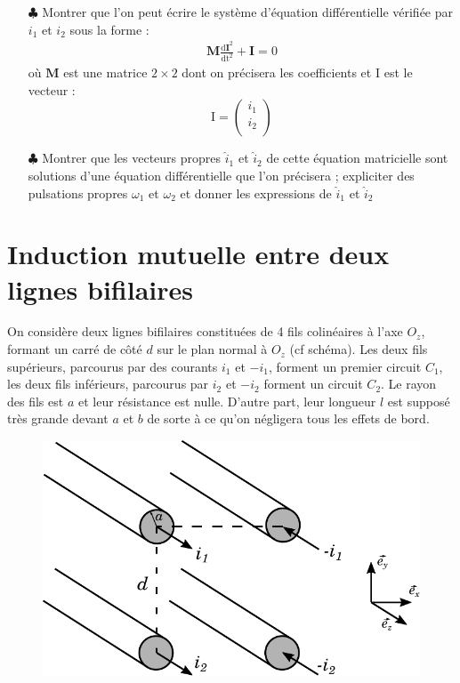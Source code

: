 \documentclass{report}
\begin{document}
\begin{itemize}

	\item[$\clubsuit$] Montrer que l'on peut écrire le système d'équation différentielle vérifiée par $i_1$ et $i_2$ sous la forme : 
	\begin{align*}
		\mathrm{\textbf{M}}\frac{\mathrm{d\textbf{I}}^2}{\mathrm{dt}^2}+\mathrm{\textbf{I}}=0
	\end{align*}
	où $\mathrm{\textbf{M}}$ est une matrice $2\times2$ dont on précisera les coefficients et $\mathrm{I}$ est le vecteur :
		\begin{equation}
	\mathrm{I}=
	\left(
	\begin{array}{ccc}
	i_1\\
	i_2\\
	\end{array}\right)
	\end{equation}		

	\item[$\clubsuit$] Montrer que les vecteurs propres $\hat{i}_1$ et $\hat{i}_2$ de cette équation matricielle sont solutions d'une équation différentielle que l'on précisera ; expliciter des pulsations propres $\omega_1$ et $\omega_2$ et donner les expressions de $\hat{i}_1$ et $\hat{i}_2$

\end{itemize}

\newpage

\section*{Induction mutuelle entre deux lignes bifilaires}

On considère deux lignes bifilaires constituées de 4 fils colinéaires à l'axe $O_z$, formant un carré de côté $d$ sur le plan normal à $O_z$ (cf schéma). Les deux fils supérieurs, parcourus par des courants $i_1$ et $-i_1$, forment un premier circuit $C_1$, les deux fils inférieurs, parcourus par $i_2$ et $-i_2$ forment un circuit $C_2$. Le rayon des fils est $a$ et leur résistance est nulle. D'autre part, leur longueur $l$ est supposé très grande devant $a$ et $b$ de sorte à ce qu'on négligera tous les effets de bord.

\begin{figure}[h!]
\centering
		\includegraphics[scale=0.7]{ligne_bifil.pdf}
\end{figure}
\end{document}
